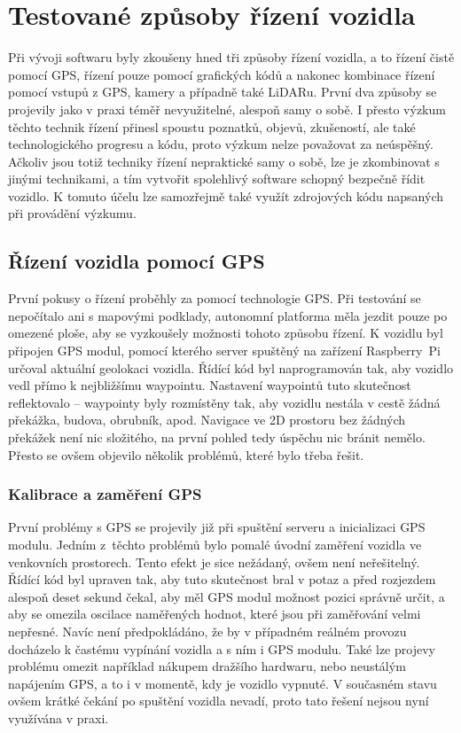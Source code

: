 \documentclass[czech, bachelor]{diploma}
\begin{document}
\chapter{Testované způsoby řízení vozidla} \label{driving-methods}

Při vývoji softwaru byly zkoušeny hned tři způsoby řízení vozidla, a to řízení čistě pomocí GPS, řízení pouze pomocí grafických
kódů a nakonec kombinace řízení pomocí vstupů z GPS, kamery a případně také LiDARu. První dva způsoby se projevily jako v praxi
téměř nevyužitelné, alespoň samy o sobě. I přesto výzkum těchto technik řízení přinesl spoustu poznatků, objevů, zkušeností, ale
také technologického progresu a kódu, proto výzkum nelze považovat za neúspěšný. Ačkoliv jsou totiž techniky řízení nepraktické
samy o sobě, lze je zkombinovat s jinými technikami, a tím vytvořit spolehlivý software schopný bezpečně řídit vozidlo. K tomuto
účelu lze samozřejmě také využít zdrojových kódu napsaných při provádění výzkumu.

\section{Řízení vozidla pomocí GPS} \label{gps-failure}

První pokusy o řízení proběhly za pomocí technologie GPS. Při testování se nepočítalo ani s mapovými podklady, autonomní platforma
měla jezdit pouze po omezené ploše, aby se vyzkoušely možnosti tohoto způsobu řízení. K vozidlu byl připojen GPS modul, pomocí
kterého server spuštěný na zařízení Raspberry~Pi určoval aktuální geolokaci vozidla. Řídící kód byl naprogramován tak, aby vozidlo
vedl přímo k nejbližšímu waypointu. Nastavení waypointů tuto skutečnost reflektovalo -- waypointy byly rozmístěny tak, aby vozidlu
nestála v cestě žádná překážka, budova, obrubník, apod. Navigace ve 2D prostoru bez žádných překážek není nic složitého, na první
pohled tedy úspěchu nic bránit nemělo. Přesto se ovšem objevilo několik problémů, které bylo třeba řešit.

\subsection{Kalibrace a zaměření GPS}

První problémy s GPS se projevily již při spuštění serveru a inicializaci GPS modulu. Jedním z~těchto problémů bylo pomalé úvodní
zaměření vozidla ve venkovních prostorech. Tento efekt je sice nežádaný, ovšem není neřešitelný. Řídící kód byl upraven tak, aby
tuto skutečnost bral v potaz a před rozjezdem alespoň deset sekund čekal, aby měl GPS modul možnost pozici správně určit, a aby se
omezila oscilace naměřených hodnot, které jsou při zaměřování velmi nepřesné. Navíc není předpokládáno, že by v případném reálném
provozu docházelo k častému vypínání vozidla a s ním i GPS modulu. Také lze projevy problému omezit například nákupem dražšího
hardwaru, nebo neustálým napájením GPS, a to i v momentě, kdy je vozidlo vypnuté. V současném stavu ovšem krátké čekání
po spuštění vozidla nevadí, proto tato řešení nejsou nyní využívána v praxi.
\end{document}
